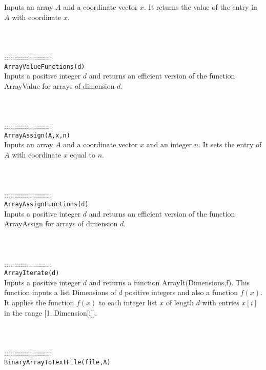 \documentclass[a4paper,11pt]{report}
\begin{document}
{ Inputs an array $A$ and a coordinate vector $x$. It returns the value of the entry in $A$ with coordinate $x$. \\
 \\
 \\
 \\
 ::::::::::::::::::::::::\\
 \texttt{ArrayValueFunctions(d)}\\
 

 Inputs a positive integer $d$ and returns an efficient version of the function ArrayValue for arrays of
dimension $d$. \\
 \\
 \\
 \\
 ::::::::::::::::::::::::\\
 \texttt{ArrayAssign(A,x,n)}\\
 

 Inputs an array $A$ and a coordinate vector $x$ and an integer $n$. It sets the entry of $A$ with coordinate $x$ equal to $n$. \\
 \\
 \\
 \\
 ::::::::::::::::::::::::\\
 \texttt{ArrayAssignFunctions(d)}\\
 

 Inputs a positive integer $d$ and returns an efficient version of the function ArrayAssign for arrays of
dimension $d$. \\
 \\
 \\
 \\
 ::::::::::::::::::::::::\\
 \texttt{ArrayIterate(d)}\\
 

 Inputs a positive integer $d$ and returns a function ArrayIt(Dimensions,f). This function inputs a list
Dimensions of $d$ positive integers and also a function $f(x)$. It applies the function $f(x)$ to each integer list $x$ of length $d$ with entries $x[i]$ in the range [1..Dimension[i]]. \\
 \\
 \\
 \\
 ::::::::::::::::::::::::\\
 \texttt{BinaryArrayToTextFile(file,A)}\\
 

}
\end{document}
